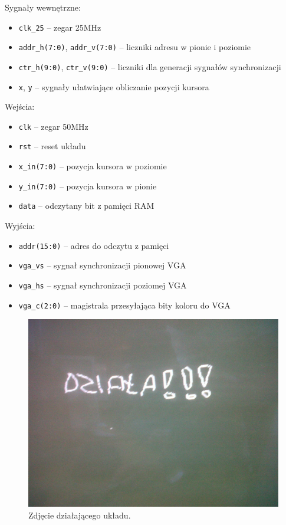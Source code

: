 Sygnały wewnętrzne:
\begin{itemize}
  \item \texttt{clk\_25} -- zegar 25MHz
  \item \texttt{addr\_h(7:0)}, \texttt{addr\_v(7:0)} -- liczniki adresu w pionie
    i poziomie
  \item \texttt{ctr\_h(9:0)}, \texttt{ctr\_v(9:0)} -- liczniki dla generacji
    sygnałów synchronizacji
  \item \texttt{x}, \texttt{y} -- sygnały ułatwiające obliczanie pozycji kursora
\end{itemize}
\vspace{1em}
Wejścia:
\begin{itemize}
  \item \texttt{clk} -- zegar 50MHz
  \item \texttt{rst} -- reset układu
  \item \texttt{x\_in(7:0)} -- pozycja kursora w poziomie
  \item \texttt{y\_in(7:0)} -- pozycja kursora w pionie
  \item \texttt{data} -- odczytany bit z pamięci RAM
\end{itemize}
\vspace{1em}
Wyjścia:
\begin{itemize}
  \item \texttt{addr(15:0)} -- adres do odczytu z pamięci
  \item \texttt{vga\_vs} -- sygnał synchronizacji pionowej VGA
  \item \texttt{vga\_hs} -- sygnał synchronizacji poziomej VGA
  \item \texttt{vga\_c(2:0)} -- magistrala przesyłająca bity koloru do VGA
\end{itemize}

\begin{figure}[h!]
\begin{center}
\includegraphics[scale=.3]{dziala.jpg}
\caption{Zdjęcie działającego układu.}
\label{fig:dziala}
\end{center}
\end{figure}

